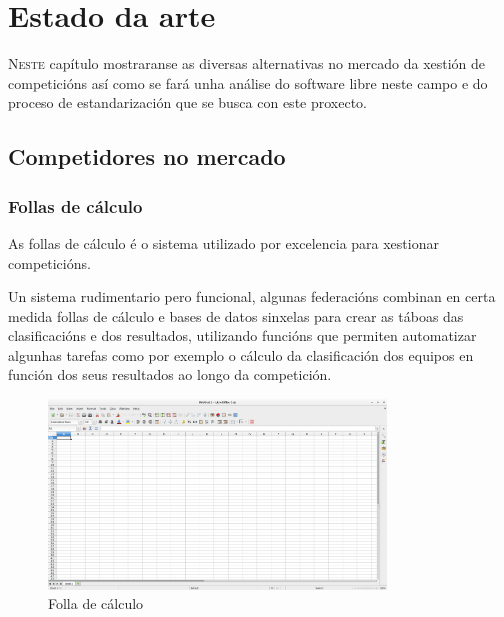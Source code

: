 \chapter{Estado da arte}
\minitoc


  \lettrine{N}{este} capítulo mostraranse as diversas alternativas no mercado da 
xestión de competicións así como se fará unha análise do software libre neste campo e do 
proceso de estandarización que se busca con este proxecto.

\clearpage

  \section{Competidores no mercado}

    \subsection{Follas de cálculo}
    As follas de cálculo é o sistema utilizado por excelencia para xestionar competicións.
    
    Un sistema rudimentario pero funcional, algunas federacións combinan en certa medida 
follas de cálculo e bases de datos sinxelas para crear as táboas das 
clasificacións e dos resultados, utilizando funcións que permiten automatizar algunhas 
tarefas como por exemplo o cálculo da clasificación dos equipos en función dos 
seus resultados ao longo da competición.

    \begin{figure}[h!]
	  \begin{center}
	    \includegraphics[width=0.8\textwidth]{./img/calculo.png}
	    \caption{Folla de cálculo}
	  \end{center}
    \end{figure}

